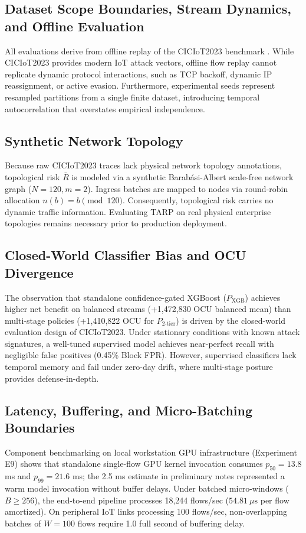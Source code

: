 \documentclass[journal,10pt,onecolumn]{IEEEtran}
\begin{document}
\subsection{Dataset Scope Boundaries, Stream Dynamics, and Offline Evaluation}
All evaluations derive from offline replay of the CICIoT2023 benchmark \cite{3}. While CICIoT2023 provides modern IoT attack vectors, offline flow replay cannot replicate dynamic protocol interactions, such as TCP backoff, dynamic IP reassignment, or active evasion. Furthermore, experimental seeds represent resampled partitions from a single finite dataset, introducing temporal autocorrelation that overstates empirical independence.

\subsection{Synthetic Network Topology}
Because raw CICIoT2023 traces lack physical network topology annotations, topological risk $\bar{R}$ is modeled via a synthetic Barabási-Albert scale-free network graph ($N=120, m=2$). Ingress batches are mapped to nodes via round-robin allocation $n(b) = b \pmod{120}$. Consequently, topological risk carries no dynamic traffic information. Evaluating TARP on real physical enterprise topologies remains necessary prior to production deployment.

\subsection{Closed-World Classifier Bias and OCU Divergence}
The observation that standalone confidence-gated XGBoost ($P_{\text{XGB}}$) achieves higher net benefit on balanced streams (+1,472,830 OCU balanced mean) than multi-stage policies (+1,410,822 OCU for $P_{2\text{-tier}}$) is driven by the closed-world evaluation design of CICIoT2023. Under stationary conditions with known attack signatures, a well-tuned supervised model achieves near-perfect recall with negligible false positives (0.45\% Block FPR). However, supervised classifiers lack temporal memory and fail under zero-day drift, where multi-stage posture provides defense-in-depth.

\subsection{Latency, Buffering, and Micro-Batching Boundaries}
Component benchmarking on local workstation GPU infrastructure (Experiment E9) shows that standalone single-flow GPU kernel invocation consumes $p_{50} = 13.8$ ms and $p_{99} = 21.6$ ms; the 2.5 ms estimate in preliminary notes represented a warm model invocation without buffer delays. Under batched micro-windows ($B \ge 256$), the end-to-end pipeline processes 18,244 flows/sec ($54.81 \ \mu\text{s}$ per flow amortized). On peripheral IoT links processing 100 flows/sec, non-overlapping batches of $W = 100$ flows require 1.0 full second of buffering delay.
\end{document}
